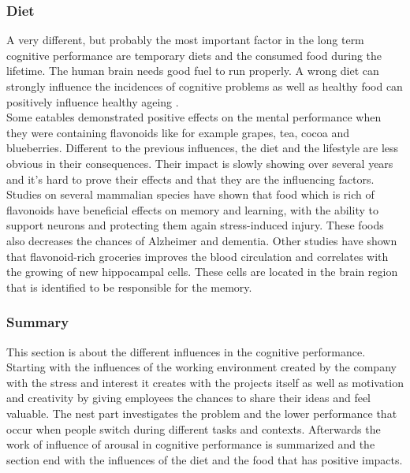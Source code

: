 \subsubsection{Diet}
A very different, but probably the most important factor in the long term cognitive performance are temporary diets and the consumed food during the lifetime. The human brain needs good fuel to run properly. A wrong diet can strongly influence the incidences of cognitive problems as well as healthy food can positively influence healthy ageing \cite{spencer2008food}.\\
Some eatables demonstrated positive effects on the mental performance when they were containing flavonoids like for example grapes, tea, cocoa and blueberries. 
Different to the previous influences, the diet and the lifestyle are less obvious in their consequences. Their impact is slowly showing over several years and it's hard to prove their effects and that they are the influencing factors.\\
Studies on several mammalian species have shown that food which is rich of flavonoids have beneficial effects on memory and learning, with the ability to support neurons and protecting them again stress-induced injury.
These foods also decreases the chances of Alzheimer and dementia. Other studies have shown that flavonoid-rich groceries improves the blood circulation and correlates with the growing of new hippocampal cells. These cells are located in the brain region that is identified to be responsible for the memory.

\subsubsection{Summary} 
This section is about the different influences in the cognitive performance. Starting with the influences of the working environment created by the company with the stress and interest it creates with the projects itself as well as motivation and creativity by giving employees the chances to share their ideas and feel valuable. The nest part investigates the problem and the lower performance that occur when people switch during different tasks and contexts. Afterwards the work of influence of arousal in cognitive performance is summarized and the section end with the influences of the diet and the food that has positive impacts. 